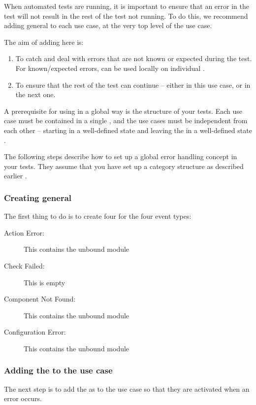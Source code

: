 When automated tests are running, it is important to ensure that an error in the test will not result in the rest of the test not running. To do this, we recommend adding general \gdehandlers{} to each use case, at the very top level of the use case. 

The aim of adding \gdehandlers{} here is:
\begin{enumerate}
\item To catch and deal with errors that are not known or expected during the test. For known/expected errors, \gdehandlers{} can be used locally on individual \gdcases{} .
\item To ensure that the rest of the test can continue -- either in this use case, or in the next one. 
\end{enumerate}

A prerequisite for using \gdehandlers{} in a global way is the structure of your tests. Each use case must be contained in a single \gdcase{}, and the use cases must be independent from each other -- starting in a well-defined state and leaving the \gdaut{} in a well-defined state . 

The following steps describe how to set up a global error handling concept in your tests. They assume that you have set up a category structure as described earlier . 

\subsubsection{Creating general \gdehandlers{}}
The first thing to do is to create four \gdcases{} for the four event types:

\begin{description}
\item[Action Error:]{This \gdcase{} contains the unbound module }
\item[Check Failed:]{This \gdcase{} is empty}
\item[Component Not Found:]{This \gdcase{} contains the unbound module }
\item[Configuration Error:]{This \gdcase{} contains the unbound module }
\end{description}


\subsubsection{Adding the \gdehandlers{} to the use case}
The next step is to add the \gdcases{} as \gdehandlers{} to the use case so that
they are activated when an error occurs. 

